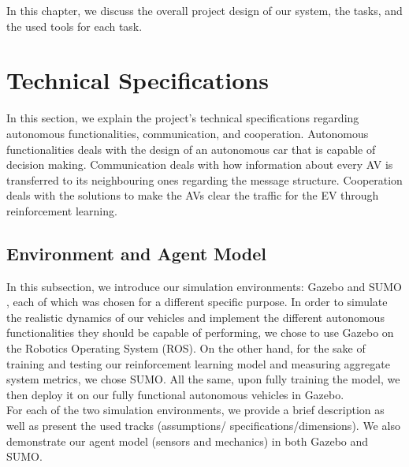 In this chapter, we discuss the overall project design of our system, the tasks, and the used tools for each task.
\label{chapter_project_design}

\section{Technical Specifications}
\label{tech_specs}
In this section, we explain the project's technical specifications regarding autonomous functionalities, communication, and cooperation. Autonomous functionalities deals with the design of an autonomous car that is capable of decision making. Communication deals with how information about every AV is transferred to its neighbouring ones regarding the message structure. Cooperation deals with the solutions to make the AVs clear the traffic for the EV through reinforcement learning.  


\subsection{Environment and Agent Model}
\label{specs_env_agent_mdl}
In this subsection, we introduce our simulation environments: Gazebo \cite{Koenig04designand} and SUMO \cite{sumomain}, each of which was chosen for a different specific purpose. In order to simulate the realistic dynamics of our vehicles and implement the different autonomous functionalities they should be capable of performing, we chose to use Gazebo on the Robotics Operating System (ROS)\cite{ROSBookMorgan}. On the other hand, for the sake of training and testing our reinforcement learning model and measuring aggregate system metrics, we chose SUMO. All the same, upon fully training the model, we then deploy it on our fully functional autonomous vehicles in Gazebo.\\
For each of the two simulation environments, we provide a brief description as well as present the used tracks (assumptions/ specifications/dimensions). We also demonstrate our agent model (sensors and mechanics) in both Gazebo and SUMO.

